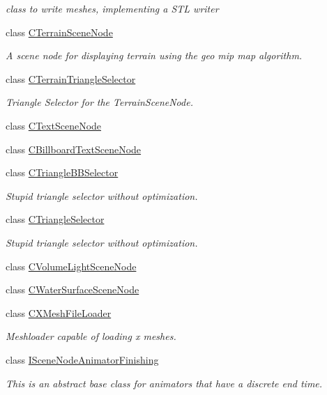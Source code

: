 \begin{DoxyCompactItemize}
\begin{DoxyCompactList}\small\item\em class to write meshes, implementing a S\-T\-L writer \end{DoxyCompactList}\item 
class \hyperlink{classirr_1_1scene_1_1_c_terrain_scene_node}{C\-Terrain\-Scene\-Node}
\begin{DoxyCompactList}\small\item\em A scene node for displaying terrain using the geo mip map algorithm. \end{DoxyCompactList}\item 
class \hyperlink{classirr_1_1scene_1_1_c_terrain_triangle_selector}{C\-Terrain\-Triangle\-Selector}
\begin{DoxyCompactList}\small\item\em Triangle Selector for the Terrain\-Scene\-Node. \end{DoxyCompactList}\item 
class \hyperlink{classirr_1_1scene_1_1_c_text_scene_node}{C\-Text\-Scene\-Node}
\item 
class \hyperlink{classirr_1_1scene_1_1_c_billboard_text_scene_node}{C\-Billboard\-Text\-Scene\-Node}
\item 
class \hyperlink{classirr_1_1scene_1_1_c_triangle_b_b_selector}{C\-Triangle\-B\-B\-Selector}
\begin{DoxyCompactList}\small\item\em Stupid triangle selector without optimization. \end{DoxyCompactList}\item 
class \hyperlink{classirr_1_1scene_1_1_c_triangle_selector}{C\-Triangle\-Selector}
\begin{DoxyCompactList}\small\item\em Stupid triangle selector without optimization. \end{DoxyCompactList}\item 
class \hyperlink{classirr_1_1scene_1_1_c_volume_light_scene_node}{C\-Volume\-Light\-Scene\-Node}
\item 
class \hyperlink{classirr_1_1scene_1_1_c_water_surface_scene_node}{C\-Water\-Surface\-Scene\-Node}
\item 
class \hyperlink{classirr_1_1scene_1_1_c_x_mesh_file_loader}{C\-X\-Mesh\-File\-Loader}
\begin{DoxyCompactList}\small\item\em Meshloader capable of loading x meshes. \end{DoxyCompactList}\item 
class \hyperlink{classirr_1_1scene_1_1_i_scene_node_animator_finishing}{I\-Scene\-Node\-Animator\-Finishing}
\begin{DoxyCompactList}\small\item\em This is an abstract base class for animators that have a discrete end time. \end{DoxyCompactList}\end{DoxyCompactItemize}
